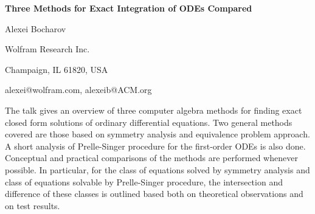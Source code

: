 

\centerline{\bf Three Methods for Exact Integration of ODEs Compared}

\vskip 0.3cm

\centerline{Alexei Bocharov}
\centerline{Wolfram Research Inc.}
\centerline{Champaign, IL 61820, USA}
\centerline{alexei@wolfram.com, alexeib@ACM.org}

\vskip 0.3cm

The talk gives an overview of three computer algebra methods for finding
exact  closed form solutions of ordinary differential equations. Two
general  methods  covered are those based on symmetry analysis and
equivalence problem approach.  A short analysis  of  Prelle-Singer
procedure for the first-order ODEs is also done.   Conceptual and
practical comparisons of the methods are performed whenever possible.
In particular, for the class of equations solved by symmetry analysis
and class of equations solvable by Prelle-Singer procedure, the
intersection and difference of these classes is outlined based both on
theoretical observations and on test results.


